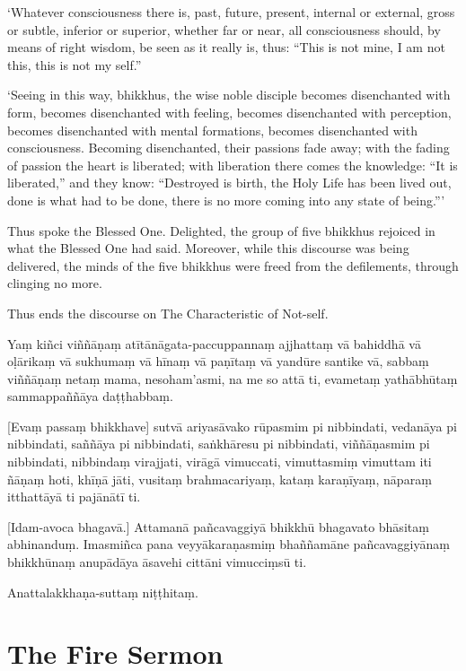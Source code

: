 \clearpage

\englishText
\markboth{\englishTitle}{\rightmark}

‘Whatever consciousness there is, past, future, present, internal or
external, gross or subtle, inferior or superior, whether far or near,
all consciousness should, by means of right wisdom, be seen as it really
is, thus: “This is not mine, I am not this, this is not my self.”

‘Seeing in this way, bhikkhus, the wise noble disciple becomes
disenchanted with form, becomes disenchanted with feeling, becomes
disenchanted with perception, becomes disenchanted with mental
formations, becomes disenchanted with consciousness. Becoming
disenchanted, their passions fade away; with the fading of passion the
heart is liberated; with liberation there comes the knowledge: “It is
liberated,” and they know: “Destroyed is birth, the Holy Life has been
lived out, done is what had to be done, there is no more coming into any
state of being.”\thinspace ’

Thus spoke the Blessed One. Delighted, the group of five bhikkhus
rejoiced in what the Blessed One had said. Moreover, while this discourse was
being delivered, the minds of the five bhikkhus were freed from the
defilements, through clinging no more.

Thus ends the discourse on The Characteristic of Not-self.

\clearpage

\paliText
\markboth{\paliTitle}{\rightmark}

Yaṃ kiñci viññāṇaṃ atītānāgata-paccuppannaṃ ajjhattaṃ vā bahiddhā vā
oḷārikaṃ vā sukhumaṃ vā hīnaṃ vā paṇītaṃ vā yandūre santike vā, sabbaṃ
viññāṇaṃ netaṃ mama, nesoham'asmi, na me so attā ti, evametaṃ yathābhūtaṃ
sammappaññāya daṭṭhabbaṃ.

[Evaṃ passaṃ bhikkhave] sutvā ariyasāvako rūpasmim pi nibbindati, vedanāya
pi nibbindati, saññāya pi nibbindati, saṅkhāresu pi nibbindati,
viññāṇasmim pi nibbindati, nibbindaṃ virajjati, virāgā vimuccati,
vimuttasmiṃ vimuttam iti ñāṇaṃ hoti, khīṇā jāti, vusitaṃ brahmacariyaṃ,
kataṃ karaṇīyaṃ, nāparaṃ itthattāyā ti pajānātī ti.

[Idam-avoca bhagavā.] Attamanā pañcavaggiyā bhikkhū bhagavato bhāsitaṃ
abhinanduṃ. Imasmiñca pana veyyākaraṇasmiṃ bhaññamāne pañcavaggiyānaṃ
bhikkhūnaṃ anupādāya āsavehi cittāni vimucciṃsū ti.

Anattalakkhaṇa-suttaṃ niṭṭhitaṃ.

\chapterTocDelegatePageNumber
\chapter{The Fire Sermon}%

